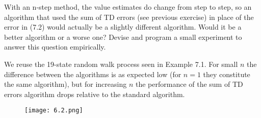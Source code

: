 
\begin{exercise}

With an n-step method, the value estimates do change from step to step,
so an algorithm that used the sum of TD errors (see previous exercise) in
place of the error in (7.2) would actually be a slightly different algorithm.
Would it be a better algorithm or a worse one? Devise and program a small
experiment to answer this question empirically.

\end{exercise}


\begin{solution}

We reuse the 19-state random walk process seen in Example 7.1.
For small $n$ the difference between the algorithms is as expected low
(for $n = 1$ they constitute the same algorithm), but for increasing $n$ the
performance of the sum of TD errors algorithm drops relative to the standard algorithm.

\begin{figure}[H]
    \centering
    \texttt{[image: 6.2.png]}
\end{figure}


\end{solution}


